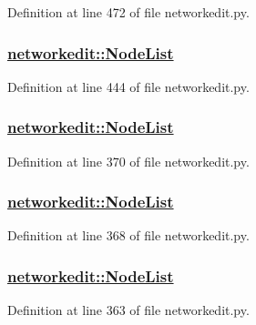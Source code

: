 Definition at line 472 of file networkedit.py.\hypertarget{namespacenetworkedit_6a4290ba38225a18362b4ef9a9463b80}{
\subsubsection[NodeList]{\setlength{\rightskip}{0pt plus 5cm}\hyperlink{namespacenetworkedit_6a4290ba38225a18362b4ef9a9463b80}{networkedit::Node\-List}}}
\label{namespacenetworkedit_6a4290ba38225a18362b4ef9a9463b80}




Definition at line 444 of file networkedit.py.\hypertarget{namespacenetworkedit_6a4290ba38225a18362b4ef9a9463b80}{
\subsubsection[NodeList]{\setlength{\rightskip}{0pt plus 5cm}\hyperlink{namespacenetworkedit_6a4290ba38225a18362b4ef9a9463b80}{networkedit::Node\-List}}}
\label{namespacenetworkedit_6a4290ba38225a18362b4ef9a9463b80}




Definition at line 370 of file networkedit.py.\hypertarget{namespacenetworkedit_6a4290ba38225a18362b4ef9a9463b80}{
\subsubsection[NodeList]{\setlength{\rightskip}{0pt plus 5cm}\hyperlink{namespacenetworkedit_6a4290ba38225a18362b4ef9a9463b80}{networkedit::Node\-List}}}
\label{namespacenetworkedit_6a4290ba38225a18362b4ef9a9463b80}




Definition at line 368 of file networkedit.py.\hypertarget{namespacenetworkedit_6a4290ba38225a18362b4ef9a9463b80}{
\subsubsection[NodeList]{\setlength{\rightskip}{0pt plus 5cm}\hyperlink{namespacenetworkedit_6a4290ba38225a18362b4ef9a9463b80}{networkedit::Node\-List}}}
\label{namespacenetworkedit_6a4290ba38225a18362b4ef9a9463b80}




Definition at line 363 of file networkedit.py.